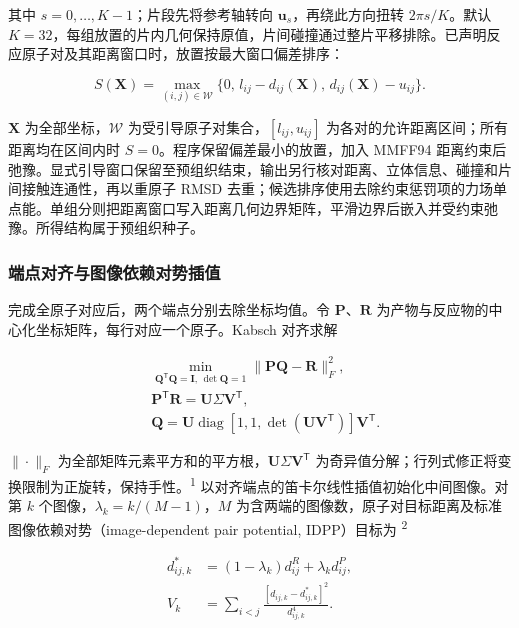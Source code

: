 其中 $s=0,\ldots,K-1$；片段先将参考轴转向 $\mathbf u_s$，再绕此方向扭转 $2\pi s/K$。默认 $K=32$，每组放置的片内几何保持原值，片间碰撞通过整片平移排除。已声明反应原子对及其距离窗口时，放置按最大窗口偏差排序：

\begin{equation}\label{eq:methods-6}
S(\mathbf X)=\max_{(i,j)\in\mathcal W}
\{0,\,l_{ij}-d_{ij}(\mathbf X),\,d_{ij}(\mathbf X)-u_{ij}\}.
\end{equation}

$\mathbf X$ 为全部坐标，$\mathcal W$ 为受引导原子对集合，$[l_{ij},u_{ij}]$ 为各对的允许距离区间；所有距离均在区间内时 $S=0$。程序保留偏差最小的放置，加入 MMFF94 距离约束后弛豫。显式引导窗口保留至预组织结束，输出另行核对距离、立体信息、碰撞和片间接触连通性，再以重原子 RMSD 去重；候选排序使用去除约束惩罚项的力场单点能。单组分则把距离窗口写入距离几何边界矩阵，平滑边界后嵌入并受约束弛豫。所得结构属于预组织种子。

\subsubsection{端点对齐与图像依赖对势插值}

完成全原子对应后，两个端点分别去除坐标均值。令 $\mathbf P$、$\mathbf R$ 为产物与反应物的中心化坐标矩阵，每行对应一个原子。Kabsch 对齐求解

\begin{equation}\label{eq:methods-7}
\begin{aligned}
&\min_{\mathbf Q^{\mathsf T}\mathbf Q=\mathbf I,\,\det\mathbf Q=1}
\|\mathbf P\mathbf Q-\mathbf R\|_F^2,\\
&\mathbf P^{\mathsf T}\mathbf R=\mathbf U\Sigma\mathbf V^{\mathsf T},\\
&\mathbf Q=\mathbf U\operatorname{diag}[1,1,\det(\mathbf U\mathbf V^{\mathsf T})]\mathbf V^{\mathsf T}.
\end{aligned}
\end{equation}

$\|\cdot\|_F$ 为全部矩阵元素平方和的平方根，$\mathbf U\Sigma\mathbf V^{\mathsf T}$ 为奇异值分解；行列式修正将变换限制为正旋转，保持手性。\textsuperscript{1} 以对齐端点的笛卡尔线性插值初始化中间图像。对第 $k$ 个图像，$\lambda_k=k/(M-1)$，$M$ 为含两端的图像数，原子对目标距离及标准图像依赖对势（image-dependent pair potential, IDPP）目标为 \textsuperscript{2}

\begin{equation}\label{eq:methods-8}
\begin{aligned}
d^*_{ij,k}&=(1-\lambda_k)d^R_{ij}+\lambda_k d^P_{ij},\\
V_k&=\sum_{i<j}\frac{[d_{ij,k}-d^*_{ij,k}]^2}{d_{ij,k}^{4}}.
\end{aligned}
\end{equation}

